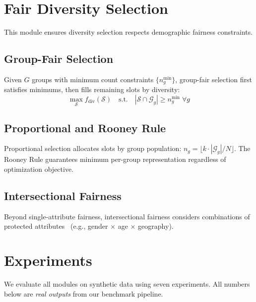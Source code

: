 \documentclass[11pt]{article}
\begin{document}
\section{Fair Diversity Selection}
\label{sec:fair}

This module ensures diversity selection respects demographic fairness
constraints.

\subsection{Group-Fair Selection}

Given $G$ groups with minimum count constraints $\{n_g^{\min}\}$, group-fair
selection first satisfies minimums, then fills remaining slots by diversity:
\begin{equation}
\max_{\mathcal{S}} f_{\text{div}}(\mathcal{S}) \quad \text{s.t.} \quad
|\mathcal{S} \cap \mathcal{G}_g| \geq n_g^{\min} \; \forall g
\end{equation}

\subsection{Proportional and Rooney Rule}

Proportional selection allocates slots by group population:
$n_g = \lfloor k \cdot |\mathcal{G}_g|/N \rfloor$.
The Rooney Rule guarantees minimum per-group representation regardless of
optimization objective.

\subsection{Intersectional Fairness}

Beyond single-attribute fairness, intersectional fairness considers
combinations of protected attributes~\citep{foulds2020intersectional}
(e.g., gender $\times$ age $\times$ geography).

\section{Experiments}
\label{sec:experiments}

We evaluate all modules on synthetic data using seven experiments. All
numbers below are \emph{real outputs} from our benchmark pipeline.
\end{document}
